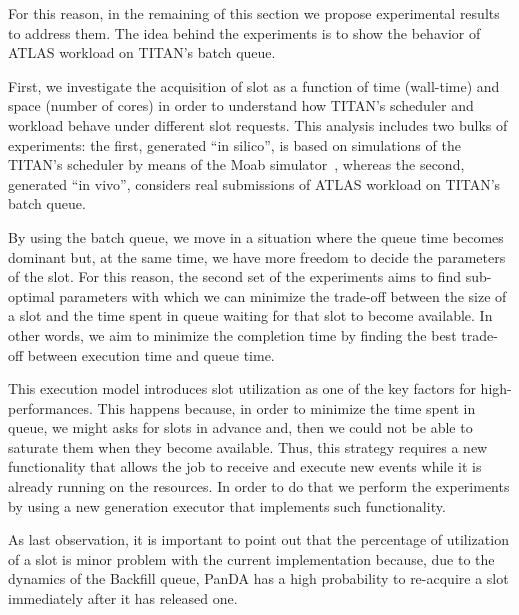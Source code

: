 For this reason, in the remaining of this section we propose experimental
results to address them. The idea behind the experiments is to show the behavior
of ATLAS workload on TITAN's batch queue.

First, we investigate the acquisition of slot as a function of time (wall-time)
and space (number of cores) in order to understand how TITAN's scheduler and
workload behave under different slot requests. This analysis includes two bulks
of experiments: the first, generated ``in silico'', is based on simulations of
the TITAN's scheduler by means of the Moab simulator~\cite{}, whereas the
second, generated ``in vivo'',  considers real submissions of ATLAS workload on
TITAN's batch queue.

By using the batch queue, we move in a situation where the queue time becomes
dominant but, at the same time, we have more freedom to decide the parameters of
the slot. For this reason, the second set of the experiments aims to find
sub-optimal parameters with which we can minimize the trade-off between the size
of a slot and the time spent in queue waiting for that slot to become available.
In other words, we aim to minimize the completion time by finding the best
trade-off between execution time and queue time.

This execution model introduces slot utilization as one of the key factors for
high-performances. This happens because, in order to minimize the time spent in
queue, we might asks for slots in advance and, then we could not be able to
saturate them when they become available. Thus, this strategy requires a new
functionality that allows the job to receive and execute new events while it is
already running on the resources. In order to do that we perform the experiments
by using a new generation executor that implements such functionality.

As last observation, it is important to point out that the percentage of
utilization of a slot is minor problem with the current implementation because,
due to the dynamics of the Backfill queue, PanDA has a high probability to
re-acquire a slot immediately after it has released one.
